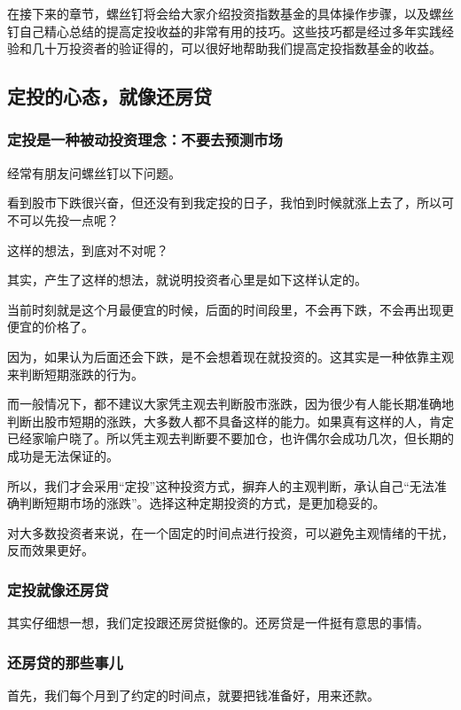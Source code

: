 在接下来的章节，螺丝钉将会给大家介绍投资指数基金的具体操作步骤，以及螺丝钉自己精心总结的提高定投收益的非常有用的技巧。这些技巧都是经过多年实践经验和几十万投资者的验证得的，可以很好地帮助我们提高定投指数基金的收益。

\subsection{定投的心态，就像还房贷}
\subsubsection{定投是一种被动投资理念：不要去预测市场}

经常有朋友问螺丝钉以下问题。

{\kaishu 看到股市下跌很兴奋，但还没有到我定投的日子，我怕到时候就涨上去了，所以可不可以先投一点呢？}

这样的想法，到底对不对呢？

其实，产生了这样的想法，就说明投资者心里是如下这样认定的。

{\kaishu 当前时刻就是这个月最便宜的时候，后面的时间段里，不会再下跌，不会再出现更便宜的价格了。}

因为，如果认为后面还会下跌，是不会想着现在就投资的。这其实是一种依靠主观来判断短期涨跌的行为。

而一般情况下，都不建议大家凭主观去判断股市涨跌，因为很少有人能长期准确地判断出股市短期的涨跌，大多数人都不具备这样的能力。如果真有这样的人，肯定已经家喻户晓了。所以凭主观去判断要不要加仓，也许偶尔会成功几次，但长期的成功是无法保证的。

所以，我们才会采用“定投”这种投资方式，摒弃人的主观判断，承认自己“无法准确判断短期市场的涨跌”。选择这种定期投资的方式，是更加稳妥的。

对大多数投资者来说，在一个固定的时间点进行投资，可以避免主观情绪的干扰，反而效果更好。

\subsubsection{定投就像还房贷}

其实仔细想一想，我们定投跟还房贷挺像的。还房贷是一件挺有意思的事情。

\subsubsection{还房贷的那些事儿}

首先，我们每个月到了约定的时间点，就要把钱准备好，用来还款。

